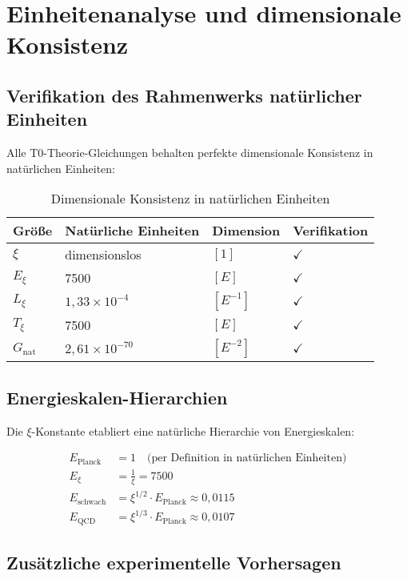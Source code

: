 \documentclass[12pt,a4paper]{article}
\theoremstyle{definition}
\theoremstyle{remark}
\begin{document}
	\section{Einheitenanalyse und dimensionale Konsistenz}
	
	\subsection{Verifikation des Rahmenwerks nat\"urlicher Einheiten}
	
	Alle T0-Theorie-Gleichungen behalten perfekte dimensionale Konsistenz in nat\"urlichen Einheiten:
	
	\begin{table}[h]
		\centering
		\begin{tabular}{l l l l}
			\toprule
			Gr\"o\ss{}e & Nat\"urliche Einheiten & Dimension & Verifikation \\
			\midrule
			$\xi$ & dimensionslos & $[1]$ & $\checkmark$ \\
			$E_\xi$ & 7500 & $[E]$ & $\checkmark$ \\
			$L_\xi$ & $1,33 \times 10^{-4}$ & $[E^{-1}]$ & $\checkmark$ \\
			$T_\xi$ & 7500 & $[E]$ & $\checkmark$ \\
			$G_{\text{nat}}$ & $2,61 \times 10^{-70}$ & $[E^{-2}]$ & $\checkmark$ \\
			\bottomrule
		\end{tabular}
		\caption{Dimensionale Konsistenz in nat\"urlichen Einheiten}
	\end{table}
	
	\subsection{Energieskalen-Hierarchien}
	
	Die $\xi$-Konstante etabliert eine nat\"urliche Hierarchie von Energieskalen:
	
	\begin{align}
		E_{\text{Planck}} &= 1 \quad \text{(per Definition in nat\"urlichen Einheiten)} \\
		E_\xi &= \frac{1}{\xi} = 7500 \\
		E_{\text{schwach}} &= \xi^{1/2} \cdot E_{\text{Planck}} \approx 0,0115 \\
		E_{\text{QCD}} &= \xi^{1/3} \cdot E_{\text{Planck}} \approx 0,0107
	\end{align}
	
	\subsection{Zus\"atzliche experimentelle Vorhersagen}
	
\end{document}
